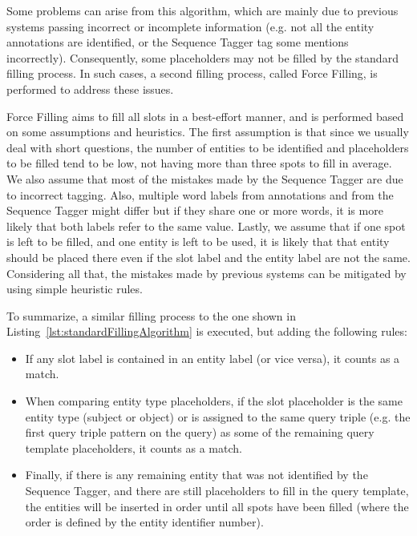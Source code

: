 Some problems can arise from this algorithm, which are mainly due to previous systems passing 
incorrect or incomplete information (e.g. not all the entity annotations are identified, or 
the Sequence Tagger tag some mentions incorrectly). Consequently, some placeholders may not 
be filled by the standard filling process. In such cases, a second filling process, called 
Force Filling, is performed to address these issues.

Force Filling aims to fill all slots in a best-effort manner, and is performed based on some 
assumptions and heuristics. The first assumption is that since we usually deal with short 
questions, the number of entities to be identified and placeholders to be filled tend to be 
low, not having more than three spots to fill in average. We also assume that most of the 
mistakes made by the Sequence Tagger are due to incorrect tagging. Also, multiple word labels 
from annotations and from the Sequence Tagger might differ but if they share one or more 
words, it is more likely that both labels refer to the same value. Lastly, we assume that if 
one spot is left to be filled, and one entity is left to be used, it is likely that that 
entity should be placed there even if the slot label and the entity label are not the same. 
Considering all that, the mistakes made by previous systems can be mitigated by using simple 
heuristic rules. 

To summarize, a similar filling process to the one shown in Listing~\ref{lst:standardFillingAlgorithm} 
is executed, but adding the following rules:
\begin{itemize}
    \item If any slot label is contained in an entity label (or vice versa), it counts as a 
    match.
    \item When comparing entity type placeholders, if the slot placeholder is the same entity 
    type (subject or object) or is assigned to the same query triple (e.g. the first query 
    triple pattern on the \SPARQL{} query) as some of the remaining query template placeholders, 
    it counts as a match.
    \item Finally, if there is any remaining entity that was not identified by the Sequence 
    Tagger, and there are still placeholders to fill in the query template, the entities will 
    be inserted in order until all spots have been filled (where the order is defined by the 
    entity identifier number).
\end{itemize}

